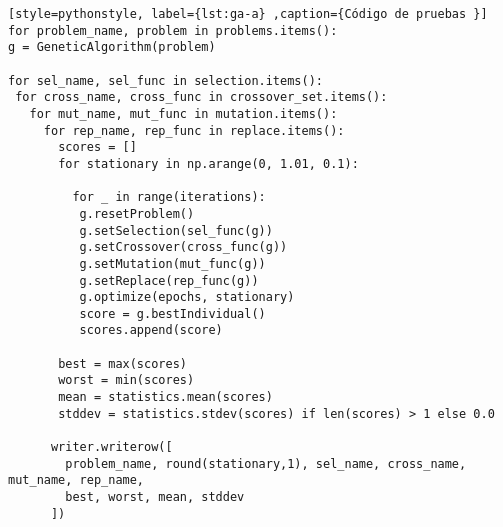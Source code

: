 \begin{lstlisting}[style=pythonstyle, label={lst:ga-a} ,caption={Código de pruebas }]
for problem_name, problem in problems.items():
g = GeneticAlgorithm(problem)

for sel_name, sel_func in selection.items():
 for cross_name, cross_func in crossover_set.items():
   for mut_name, mut_func in mutation.items():
     for rep_name, rep_func in replace.items():
       scores = []
       for stationary in np.arange(0, 1.01, 0.1):

	     for _ in range(iterations): 
		  g.resetProblem()
		  g.setSelection(sel_func(g))
		  g.setCrossover(cross_func(g))
		  g.setMutation(mut_func(g))
		  g.setReplace(rep_func(g))
		  g.optimize(epochs, stationary)
		  score = g.bestIndividual()
		  scores.append(score)

 	   best = max(scores)
	   worst = min(scores)
	   mean = statistics.mean(scores)
	   stddev = statistics.stdev(scores) if len(scores) > 1 else 0.0

	  writer.writerow([
	    problem_name, round(stationary,1), sel_name, cross_name, mut_name, rep_name,
	    best, worst, mean, stddev
	  ])
\end{lstlisting}




